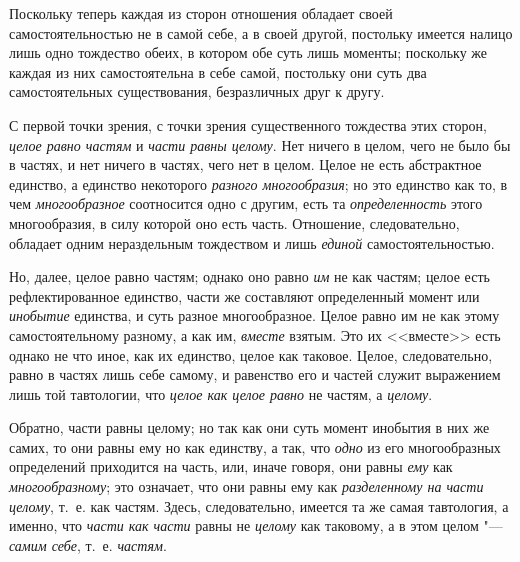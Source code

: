 Поскольку теперь каждая из сторон отношения обладает своей
самостоятельностью не в самой себе, а в своей другой, постольку имеется
налицо лишь одно тождество обеих, в котором обе суть лишь моменты;
поскольку же каждая из них самостоятельна в себе самой, постольку они суть
два самостоятельных существования, безразличных друг к другу.

С первой точки зрения, с точки зрения существенного тождества этих сторон,
{\em целое равно частям} и
{\em части равны целому}. Нет ничего в целом, чего не
было бы в частях, и нет ничего в частях, чего нет в целом. Целое не есть
абстрактное единство, а единство некоторого
{\em разного многообразия}; но это единство как то, в
чем {\em многообразное} соотносится одно с другим, есть
та {\em определенность} этого многообразия, в силу
которой оно есть часть. Отношение, следовательно, обладает одним
нераздельным тождеством и лишь {\em единой}
самостоятельностью.

Но, далее, целое равно частям; однако оно равно {\em им}
не как частям; целое есть рефлектированное единство, части же составляют
определенный момент или {\em инобытие} единства, и суть
разное многообразное. Целое равно им не как этому самостоятельному разному,
а как им, {\em вместе} взятым. Это их <<вместе>> есть
однако не что иное, как их единство, целое как таковое. Целое,
следовательно, равно в частях лишь себе самому, и равенство его и частей
служит выражением лишь той тавтологии, что {\em целое
как целое равно} не частям, а {\em целому}.

Обратно, части равны целому; но так как они суть момент инобытия в них же
самих, то они равны ему но как единству, а так, что
{\em одно} из его многообразных определений приходится
на часть, или, иначе говоря, они равны {\em ему} как
{\em многообразному}; это означает, что они равны ему
как {\em разделенному на части целому}, т.~е. как
частям. Здесь, следовательно, имеется та же самая тавтология, а именно, что
{\em части как части} равны не {\em целому} как таковому, а в этом целом
"--- {\em самим себе}, т.~е.  {\em частям}.

